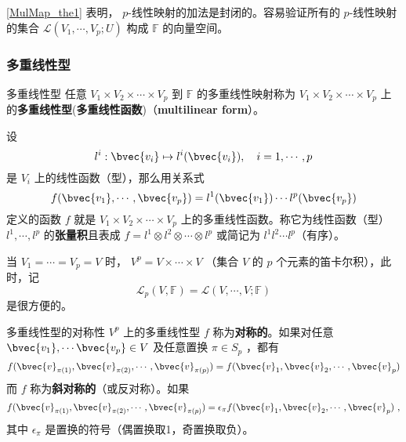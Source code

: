 \autoref{MulMap_the1} 表明， $p$-线性映射的加法是封闭的。容易验证所有的 $p$-线性映射的集合 $\mathcal{L}(V_1,\cdots,V_p;U)$ 构成 $\mathbb{F}$ 的向量空间。
\subsubsection{多重线性型}
\begin{definition}{多重线性型}\label{MulMap_def2}
任意 $V_1\times V_2\times\cdots\times V_p$ 到 $\mathbb{F}$ 的多重线性映射称为 $V_1\times V_2\times\cdots\times V_p$ 上的\textbf{多重线性型}(\textbf{多重线性函数})（\textbf{multilinear form}）。
\end{definition}
\begin{example}{}
设
\begin{equation}
l^i:\bvec{v_i}\mapsto l^i(\bvec{v_i}),\quad i=1,\cdots,p
\end{equation}
是 $V_i$ 上的线性函数（型），那么用关系式
\begin{equation}
f(\bvec{v_1},\cdots,\bvec{v_p})=l^1(\bvec{v_1})\cdots l^p(\bvec{v_p})
\end{equation}
定义的函数 $f$ 就是 $V_1\times V_2\times\cdots\times V_p$ 上的多重线性函数。称它为线性函数（型）$l^1,\cdots,l^p$ 的\textbf{张量积}且表成 $f=l^1\otimes l^2\otimes\cdots\otimes l^p$ 或简记为 $l^1l^2\cdots l^p$（有序）。
\end{example}
当 $V_1=\cdots=V_p=V$ 时， $V^p=V\times\cdots\times V$ （集合 $V$ 的 $p$ 个元素的笛卡尔积），此时，记
\begin{equation}
\mathcal{L}_p(V,\mathbb{F})=\mathcal{L}(V,\cdots,V;\mathbb{F})
\end{equation}
是很方便的。
\begin{definition}{多重线性型的对称性}\label{MulMap_def1}
$V^p$ 上的多重线性型 $f$ 称为\textbf{对称的}。如果对任意 $\bvec{v_1},\cdots\bvec{v_p}\in V$ 及任意置换 $\pi\in S_p$ ，都有
\begin{equation}
f(\bvec{v}_{\pi(1)},\bvec{v}_{\pi(2)},\cdots,\bvec{v}_{\pi(p)})=f(\bvec{v}_1,\bvec{v}_2,\cdots,\bvec{v}_p)
\end{equation}
而 $f$ 称为\textbf{斜对称的}（或反对称）。如果
\begin{equation}
f(\bvec{v}_{\pi(1)},\bvec{v}_{\pi(2)},\cdots,\bvec{v}_{\pi(p)})=\epsilon_\pi f(\bvec{v}_1,\bvec{v}_2,\cdots,\bvec{v}_p)~,
\end{equation}
其中 $\epsilon_\pi$ 是置换的符号（偶置换取1，奇置换取负）。
\end{definition}